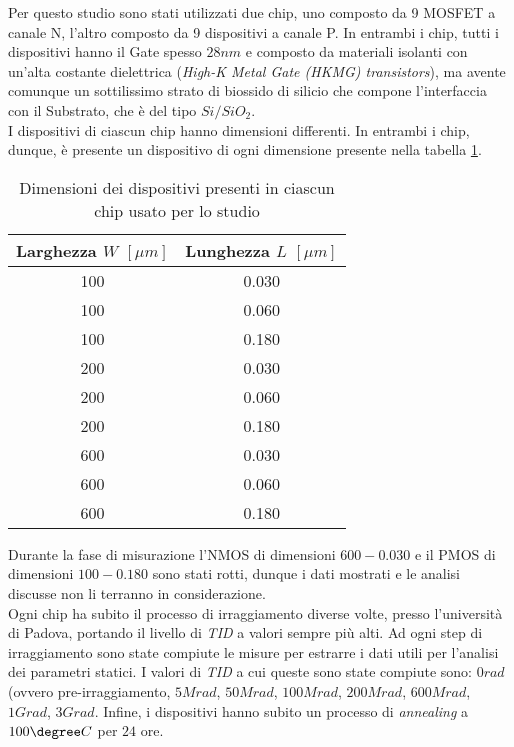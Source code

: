Per questo studio sono stati utilizzati due chip, uno composto da 9 MOSFET a canale N, l'altro composto da 9 dispositivi a canale P. In entrambi i chip, tutti i dispositivi hanno il Gate spesso $28 nm$ e composto da materiali isolanti con un'alta costante dielettrica (\emph{High-K Metal Gate (HKMG) transistors}), ma avente comunque un sottilissimo strato di biossido di silicio che compone l'interfaccia con il Substrato, che è del tipo $Si/SiO_2$. \\

I dispositivi di ciascun chip hanno dimensioni differenti. In entrambi i chip, dunque, è presente un dispositivo di ogni dimensione presente nella tabella \ref{tab:dimensioniMOSFET}.

\begin{table}[ht]
  \renewcommand{\arraystretch}{1.3}
  \centering
    \begin{tabular}{c c }
      \toprule
          Larghezza $W$ $[\mu m]$ & Lunghezza $L$ $[\mu m]$ \\
     \midrule
	   100 & 0.030 \\
	\hline
	   100 & 0.060 \\
	\hline
	   100 & 0.180 \\
	\hline
	   200 & 0.030 \\
 	\hline
	   200 & 0.060 \\
	\hline
	   200 & 0.180 \\
	\hline
 	   600 & 0.030 \\
	\hline
	   600 & 0.060 \\
	\hline
	   600 & 0.180 \\
      \bottomrule
    \end{tabular}
 
  \caption{Dimensioni dei dispositivi presenti in ciascun chip usato per lo studio}
  \label{tab:dimensioniMOSFET}
\end{table}

Durante la fase di misurazione l'NMOS di dimensioni $600-0.030$ e il PMOS di dimensioni $100-0.180$ sono stati rotti, dunque i dati mostrati e le analisi discusse non li terranno in considerazione.\\

Ogni chip ha subito il processo di irraggiamento diverse volte, presso l'università di Padova, portando il livello di \emph{TID} a valori sempre più alti. Ad ogni step di irraggiamento sono state compiute le misure per estrarre i dati utili per l'analisi dei parametri statici. I valori di \emph{TID} a cui queste sono state compiute sono: $0 rad$ (ovvero pre-irraggiamento, $5 Mrad$, $50 Mrad$, $100 Mrad$, $200 Mrad$, $600 Mrad$, $1 Grad$, $3 Grad$. Infine, i dispositivi hanno subito un processo di \emph{annealing} a $100\degree C$ per $24$ ore.

